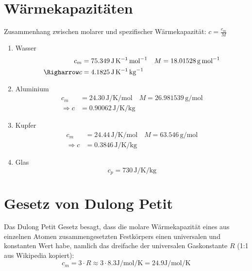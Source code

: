 \documentclass[a4paper]{article}
\begin{document}
\section{Wärmekapazitäten}
Zusammenhang zwischen molarer und spezifischer Wärmekapazität: 
$c = \frac{c_m}{M}$
\begin{enumerate}
	\item Wasser \cite{janaf}
		\begin{align*}
			c_m &= 75.349 \, \si{\joule\per\kelvin\per\mol}
			\quad
			M = 18.01528 \, \si{\gram\per\mol} 
			\\
			\Righarrow c &= 4.1825 \, \si{\joule\per\kelvin\per\kg}
		\end{align*}
	\item Aluminium \cite[16]{handbuch}
		\begin{align*}
			c_m &= 24.30 \, \si{\joule\per\kelvin\per\mol}
			\quad
			M = 26.981539 \, \si{\gram\per\mol} 
			\\
			\Rightarrow c &= 0.90062 \, \si{\joule\per\kelvin\per\kg}
		\end{align*}
	\item Kupfer \cite[133f]{handbuch}
		\begin{align*}
			c_m &= 24.44 \, \si{\joule\per\kelvin\per\mol}
			\quad
			M = 63.546 \, \si{\gram\per\mol} 
			\\
			\Rightarrow c &= 0.3846 \, \si{\joule\per\kelvin\per\kg}
		\end{align*}
	\item Glas \cite[944f]{handbuch} 
		\[
			c_p = 730 \,\si{\joule\per\kelvin\per\kg}
		\]
\end{enumerate}

\section{Gesetz von Dulong Petit}
Das Dulong Petit Gesetz besagt, dass die molare Wärmekapazität eines aus einzelnen Atomen zusammengesetzten 
Festkörpers einen universalen und konstanten Wert habe, namlich das dreifache der universalen
Gaskonstante $R$ (1:1 aus Wikipedia kopiert):
\[
	c_m 
	= 3 \cdot R
	\approx 3 \cdot 8.3 \si{\joule\per\mol\per\kelvin}
	= 24.9 \si{\joule\per\mol\per\kelvin}
\]


\printbibliography
\end{document}

